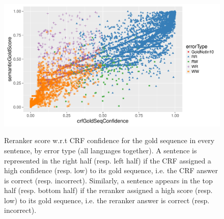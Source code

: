 \documentclass[output=paper,modfonts,nonflat]{langsci/langscibook}
\begin{document}
\begin{figure}
  \centering
      {\includegraphics[scale=0.47]{figures/graph-points-gold-confidence-vs-score-by-error-type.pdf}}
      {\caption{{ Reranker score w.r.t CRF confidence for the gold
            sequence in every sentence, by error type (all languages
            together).} A sentence is represented in the right half
          (resp. left half) if the CRF assigned a high confidence
          (resp. low) to its gold sequence, i.e. the CRF answer is
          correct (resp. incorrect). Similarly, a sentence appears in
          the top half (resp. bottom half) if the reranker assigned a
          high score (resp. low) to its gold sequence, i.e. the
          reranker answer is correct
          (resp. incorrect).\protect\footnotemark
        }\label{fig:goldConfidenceVsScoreByError}}
\end{figure}


\end{document}
